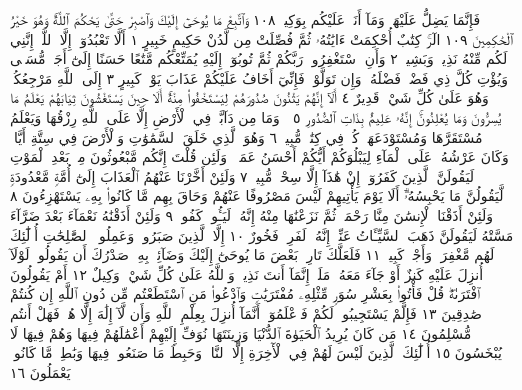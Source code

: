 فَإِنَّمَا يَضِلُّ عَلَيْهَاۖ وَمَآ أَنَا۠ عَلَيْكُم بِوَكِيلࣲ ١٠٨ وَٱتَّبِعْ مَا يُوحَىٰٓ
إِلَيْكَ وَٱصْبِرْ حَتَّىٰ يَحْكُمَ ٱللَّهُۚ وَهُوَ خَيْرُ ٱلْحَٰكِمِينَ ١٠٩
الٓرۚ كِتَٰبٌ أُحْكِمَتْ ءَايَٰتُهُۥ ثُمَّ فُصِّلَتْ مِن لَّدُنْ حَكِيمٍ خَبِيرٍ ١
أَلَّا تَعْبُدُوٓا۟ إِلَّا ٱللَّهَۚ إِنَّنِي لَكُم مِّنْهُ نَذِيرࣱ وَبَشِيرࣱ ٢ وَأَنِ ٱسْتَغْفِرُوا۟
رَبَّكُمْ ثُمَّ تُوبُوٓا۟ إِلَيْهِ يُمَتِّعْكُم مَّتَٰعًا حَسَنًا إِلَىٰٓ أَجَلࣲ مُّسَمࣰّى وَيُؤْتِ
كُلَّ ذِي فَضْلࣲ فَضْلَهُۥۖ وَإِن تَوَلَّوْا۟ فَإِنِّيٓ أَخَافُ عَلَيْكُمْ عَذَابَ يَوْمࣲ
كَبِيرٍ ٣ إِلَى ٱللَّهِ مَرْجِعُكُمْۖ وَهُوَ عَلَىٰ كُلِّ شَيْءࣲ قَدِيرٌ ٤ أَلَآ إِنَّهُمْ
يَثْنُونَ صُدُورَهُمْ لِيَسْتَخْفُوا۟ مِنْهُۚ أَلَا حِينَ يَسْتَغْشُونَ ثِيَابَهُمْ
يَعْلَمُ مَا يُسِرُّونَ وَمَا يُعْلِنُونَۚ إِنَّهُۥ عَلِيمُۢ بِذَاتِ ٱلصُّدُورِ ٥
۞ وَمَا مِن دَآبَّةࣲ فِي ٱلْأَرْضِ إِلَّا عَلَى ٱللَّهِ رِزْقُهَا وَيَعْلَمُ
مُسْتَقَرَّهَا وَمُسْتَوْدَعَهَاۚ كُلࣱّ فِي كِتَٰبࣲ مُّبِينࣲ ٦ وَهُوَ
ٱلَّذِي خَلَقَ ٱلسَّمَٰوَٰتِ وَٱلْأَرْضَ فِي سِتَّةِ أَيَّامࣲ وَكَانَ
عَرْشُهُۥ عَلَى ٱلْمَآءِ لِيَبْلُوَكُمْ أَيُّكُمْ أَحْسَنُ عَمَلࣰاۗ وَلَئِن
قُلْتَ إِنَّكُم مَّبْعُوثُونَ مِنۢ بَعْدِ ٱلْمَوْتِ لَيَقُولَنَّ ٱلَّذِينَ كَفَرُوٓا۟
إِنْ هَٰذَآ إِلَّا سِحْرࣱ مُّبِينࣱ ٧ وَلَئِنْ أَخَّرْنَا عَنْهُمُ ٱلْعَذَابَ إِلَىٰٓ
أُمَّةࣲ مَّعْدُودَةࣲ لَّيَقُولُنَّ مَا يَحْبِسُهُۥٓۗ أَلَا يَوْمَ يَأْتِيهِمْ لَيْسَ
مَصْرُوفًا عَنْهُمْ وَحَاقَ بِهِم مَّا كَانُوا۟ بِهِۦ يَسْتَهْزِءُونَ ٨
وَلَئِنْ أَذَقْنَا ٱلْإِنسَٰنَ مِنَّا رَحْمَةࣰ ثُمَّ نَزَعْنَٰهَا مِنْهُ إِنَّهُۥ
لَيَـُٔوسࣱ كَفُورࣱ ٩ وَلَئِنْ أَذَقْنَٰهُ نَعْمَآءَ بَعْدَ ضَرَّآءَ
مَسَّتْهُ لَيَقُولَنَّ ذَهَبَ ٱلسَّيِّـَٔاتُ عَنِّيٓۚ إِنَّهُۥ لَفَرِحࣱ فَخُورٌ ١٠
إِلَّا ٱلَّذِينَ صَبَرُوا۟ وَعَمِلُوا۟ ٱلصَّٰلِحَٰتِ أُو۟لَٰٓئِكَ لَهُم
مَّغْفِرَةࣱ وَأَجْرࣱ كَبِيرࣱ ١١ فَلَعَلَّكَ تَارِكُۢ بَعْضَ مَا يُوحَىٰٓ إِلَيْكَ
وَضَآئِقُۢ بِهِۦ صَدْرُكَ أَن يَقُولُوا۟ لَوْلَآ أُنزِلَ عَلَيْهِ كَنزٌ أَوْ جَآءَ
مَعَهُۥ مَلَكٌۚ إِنَّمَآ أَنتَ نَذِيرࣱۚ وَٱللَّهُ عَلَىٰ كُلِّ شَيْءࣲ وَكِيلٌ ١٢
أَمْ يَقُولُونَ ٱفْتَرَىٰهُۖ قُلْ فَأْتُوا۟ بِعَشْرِ سُوَرࣲ مِّثْلِهِۦ مُفْتَرَيَٰتࣲ
وَٱدْعُوا۟ مَنِ ٱسْتَطَعْتُم مِّن دُونِ ٱللَّهِ إِن كُنتُمْ صَٰدِقِينَ ١٣
فَإِلَّمْ يَسْتَجِيبُوا۟ لَكُمْ فَٱعْلَمُوٓا۟ أَنَّمَآ أُنزِلَ بِعِلْمِ ٱللَّهِ وَأَن
لَّآ إِلَٰهَ إِلَّا هُوَۖ فَهَلْ أَنتُم مُّسْلِمُونَ ١٤ مَن كَانَ يُرِيدُ ٱلْحَيَوٰةَ
ٱلدُّنْيَا وَزِينَتَهَا نُوَفِّ إِلَيْهِمْ أَعْمَٰلَهُمْ فِيهَا وَهُمْ فِيهَا
لَا يُبْخَسُونَ ١٥ أُو۟لَٰٓئِكَ ٱلَّذِينَ لَيْسَ لَهُمْ فِي ٱلْأٓخِرَةِ إِلَّا
ٱلنَّارُۖ وَحَبِطَ مَا صَنَعُوا۟ فِيهَا وَبَٰطِلࣱ مَّا كَانُوا۟ يَعْمَلُونَ ١٦
